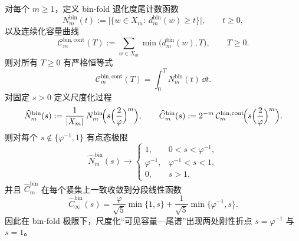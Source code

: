 \begin{proposition}\label{prop:fold-bin-degeneracy-tail-capacity-kinks}
对每个 \(m\ge 1\)，定义 bin-fold 退化度尾计数函数
\[
N^{\mathrm{bin}}_m(t):=\bigl|\{w\in X_m:\ d^{\mathrm{bin}}_m(w)\ge t\}\bigr|,\qquad t\ge 0,
\]
以及连续化容量曲线
\[
\mathcal{C}^{\mathrm{bin,cont}}_m(T):=\sum_{w\in X_m}\min\bigl(d^{\mathrm{bin}}_m(w),T\bigr),\qquad T\ge 0.
\]
则对所有 \(T\ge 0\) 有严格恒等式
\[
\mathcal{C}^{\mathrm{bin,cont}}_m(T)=\int_{0}^{T}N^{\mathrm{bin}}_m(t)\,\dd t.
\]
对固定 \(s>0\) 定义尺度化过程
\[
\widehat N^{\mathrm{bin}}_m(s):=\frac{1}{|X_m|}\,N^{\mathrm{bin}}_m\!\Bigl(s\Bigl(\frac{2}{\varphi}\Bigr)^m\Bigr),
\qquad
\widehat C^{\mathrm{bin}}_m(s):=2^{-m}\,\mathcal{C}^{\mathrm{bin,cont}}_m\!\Bigl(s\Bigl(\frac{2}{\varphi}\Bigr)^m\Bigr).
\]
则对每个 \(s\notin\{\varphi^{-1},1\}\) 有点态极限
\[
\widehat N^{\mathrm{bin}}_m(s)\longrightarrow
\begin{cases}
1, & 0<s<\varphi^{-1},\\[2pt]
\varphi^{-1}, & \varphi^{-1}<s<1,\\[2pt]
0, & s>1,
\end{cases}
\]
并且 \(\widehat C^{\mathrm{bin}}_m\) 在每个紧集上一致收敛到分段线性函数
\[
\widehat C^{\mathrm{bin}}_\infty(s)
=\frac{\varphi}{\sqrt5}\min\{1,s\}+\frac{1}{\sqrt5}\min\{\varphi^{-1},s\}.
\]
因此在 bin-fold 极限下，尺度化“可见容量—尾谱”出现两处刚性折点 \(s=\varphi^{-1}\) 与 \(s=1\)。
\end{proposition}
